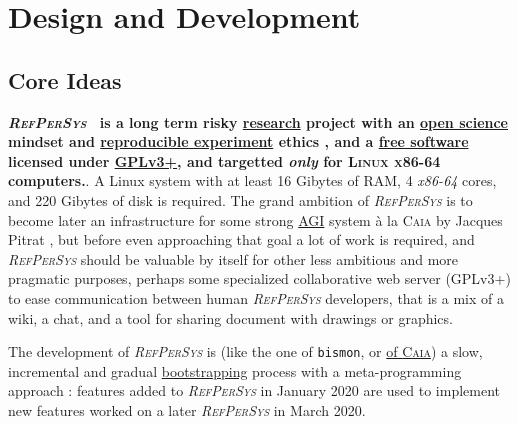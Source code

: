 \documentclass{IEEEtran}
\newcommand{\RefPerSys}{{\textit{\textsc{RefPerSys}}}}
\begin{document}
\section{Design and Development}
\label{sec:design-dev}

\subsection{Core Ideas}
\label{subsec:core-ideas}
\textbf{\RefPerSys~ is a long term risky
  \href{https://en.wikipedia.org/wiki/Research}{research} project with
  an \href{https://en.wikipedia.org/wiki/Open_science}{open science}
  mindset and
  \href{https://ropensci.github.io/reproducibility-guide/sections/introduction/}{reproducible
    experiment} ethics \cite{zuboff:2015:big-other,
    oneil:2016:weapons}, and a
  \href{https://www.gnu.org/philosophy/free-sw.en.html}{free software}
  licensed under
  \href{https://www.gnu.org/licenses/gpl-3.0.html}{GPLv3+}, and
  targetted \emph{only} for \textsc{Linux x86-64} computers.}. A Linux
system with at least 16 Gibytes of RAM, 4 \textit{x86-64} cores, and
220 Gibytes of disk is required. The grand ambition of {\RefPerSys} is
to become later an infrastructure for some strong
\href{https://en.wikipedia.org/wiki/Artificial_general_intelligence}{AGI}
system à la \textsc{Caia} by Jacques
Pitrat \cite{Pitrat:1996:FGCS, Pitrat:2009:AST,
  Pitrat:2009:ArtifBeings}, but before even approaching that goal a
lot of work is required, and {\RefPerSys} should be valuable by
itself for other less ambitious and more pragmatic purposes, perhaps
some specialized collaborative web server (GPLv3+) to ease
communication between human {\RefPerSys} developers, that is a mix of
a wiki, a chat, and a tool for sharing document with drawings or
graphics.

The development of {\RefPerSys} is (like the one of \texttt{bismon},
or
\href{http://bootstrappingartificialintelligence.fr/WordPress3/?s=CAIA}{of
  \textsc{Caia}}) a slow, incremental and gradual
\href{https://en.wikipedia.org/wiki/Bootstrapping}{bootstrapping}
process with a meta-programming \cite{dormoy:1992:meta,
  hernandez-phillips:2019:debugging-bootstrap} approach : features
added to {\RefPerSys} in January 2020 are used to implement new
features worked on a later {\RefPerSys} in March 2020.
\end{document}
